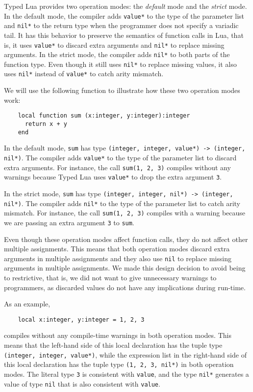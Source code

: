 Typed Lua provides two operation modes: the \emph{default} mode and
the \emph{strict} mode.
In the default mode, the compiler adds \texttt{value*} to the type
of the parameter list and \texttt{nil*} to the return type when
the programmer does not specify a variadic tail. 
It has this behavior to preserve the semantics
of function calls in Lua, that is, it uses \texttt{value*} to discard
extra arguments and \texttt{nil*} to replace missing arguments.
In the strict mode, the compiler adds \texttt{nil*} to both
parts of the function type.
Even though it still uses \texttt{nil*} to replace missing values,
it also uses \texttt{nil*} instead of \texttt{value*} to catch arity mismatch.

We will use the following function to illustrate how these two
operation modes work:
\begin{verbatim}
    local function sum (x:integer, y:integer):integer
      return x + y
    end
\end{verbatim}

In the default mode, \texttt{sum} has type
\texttt{(integer, integer, value*) -> (integer, nil*)}.
The compiler adds \texttt{value*} to the type of the parameter list
to discard extra arguments.
For instance, the call \texttt{sum(1, 2, 3)} compiles without any
warnings because Typed Lua uses \texttt{value*} to drop the extra
argument \texttt{3}.

In the strict mode, \texttt{sum} has type
\texttt{(integer, integer, nil*) -> (integer, nil*)}.
The compiler adds \texttt{nil*} to the type of the parameter
list to catch arity mismatch.
For instance, the call \texttt{sum(1, 2, 3)} compiles with a warning
because we are passing an extra argument \texttt{3} to \texttt{sum}.

Even though these operation modes affect function calls, they do not
affect other multiple assignments.
This means that both operation modes discard extra arguments in
multiple assignments and they also use \texttt{nil} to replace missing
arguments in multiple assignments.
We made this design decision to avoid being to restrictive, that is,
we did not want to give unnecessary warnings to programmers,
as discarded values do not have any implications during run-time.

As an example,
\begin{verbatim}
    local x:integer, y:integer = 1, 2, 3
\end{verbatim}
compiles without any compile-time warnings in both operation modes.
This means that the left-hand side of this local declaration has the
tuple type \texttt{(integer, integer, value*)}, while the expression
list in the right-hand side of this local declaration has the tuple
type \texttt{(1, 2, 3, nil*)} in both operation modes.
The literal type \texttt{3} is consistent with \texttt{value},
and the type \texttt{nil*} generates a value of type \texttt{nil}
that is also consistent with \texttt{value}.

